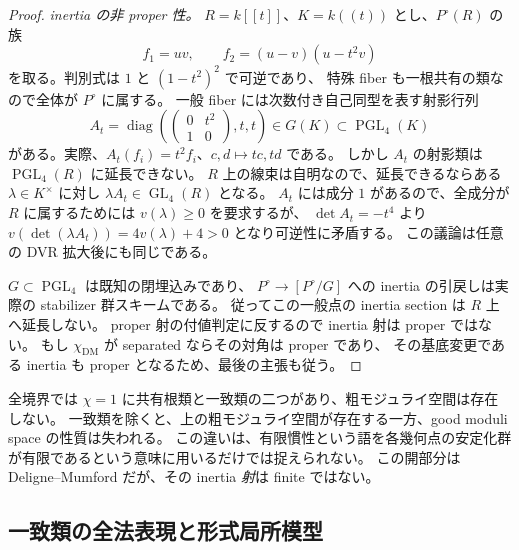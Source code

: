 \begin{proof}
\emph{inertia の非 proper 性。}
$R=k[[t]]$、$K=k((t))$ とし、$P^\circ(R)$ の族
\[
 f_1=uv,\qquad f_2=(u-v)(u-t^2v)
\]
を取る。判別式は $1$ と $(1-t^2)^2$ で可逆であり、
特殊 fiber も一根共有の類なので全体が $P^\circ$ に属する。
一般 fiber には次数付き自己同型を表す射影行列
\[
 A_t=\operatorname{diag}\!\left(
 \begin{pmatrix}0&t^2\\1&0\end{pmatrix},t,t\right)
 \in G(K)\subset\operatorname{PGL}_4(K)
\]
がある。実際、$A_t(f_i)=t^2f_i$、$c,d\mapsto tc,td$ である。
しかし $A_t$ の射影類は $\operatorname{PGL}_4(R)$ に延長できない。
$R$ 上の線束は自明なので、延長できるならある $\lambda\in K^\times$ に対し
$\lambda A_t\in\operatorname{GL}_4(R)$ となる。
$A_t$ には成分 $1$ があるので、全成分が $R$ に属するためには $v(\lambda)\ge0$ を要求するが、
$\det A_t=-t^4$ より $v(\det(\lambda A_t))=4v(\lambda)+4>0$ となり可逆性に矛盾する。
この議論は任意の DVR 拡大後にも同じである。

$G\subset\operatorname{PGL}_4$ は既知の閉埋込みであり、
$P^\circ\to[P^\circ/G]$ への inertia の引戻しは実際の stabilizer 群スキームである。
従ってこの一般点の inertia section は $R$ 上へ延長しない。
proper 射の付値判定に反するので inertia 射は proper ではない。
もし $\chi_{\mathrm{DM}}$ が separated ならその対角は proper であり、
その基底変更である inertia も proper となるため、最後の主張も従う。
\end{proof}

\begin{remark}
全境界では $\chi=1$ に共有根類と一致類の二つがあり、粗モジュライ空間は存在しない。
一致類を除くと、上の粗モジュライ空間が存在する一方、good moduli space の性質は失われる。
この違いは、有限慣性という語を各幾何点の安定化群が有限であるという意味に用いるだけでは捉えられない。
この開部分は Deligne--Mumford だが、その inertia \emph{射}は finite ではない。
\end{remark}

\subsection{一致類の全法表現と形式局所模型}

